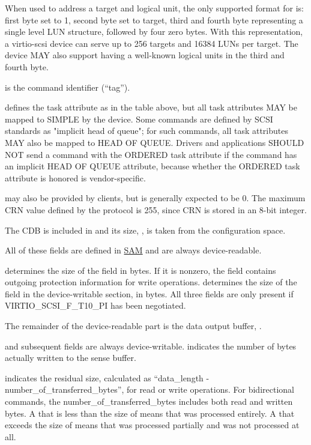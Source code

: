 When used to address a target and logical unit, the only supported format
for  is: first byte set to 1, second byte set to target,
third and fourth byte representing a single level LUN structure, followed
by four zero bytes. With this representation, a virtio-scsi device can
serve up to 256 targets and 16384 LUNs per target.  The device MAY also
support having a well-known logical units in the third and fourth byte.

 is the command identifier (``tag'').

 defines the task attribute as in the table above, but
all task attributes MAY be mapped to SIMPLE by the device.  Some commands
are defined by SCSI standards as "implicit head of queue"; for such
commands, all task attributes MAY also be mapped to HEAD OF QUEUE.
Drivers and applications SHOULD NOT send a command with the ORDERED
task attribute if the command has an implicit HEAD OF QUEUE attribute,
because whether the ORDERED task attribute is honored is vendor-specific.

 may also be provided by clients, but is generally expected
to be 0. The maximum CRN value defined by the protocol is 255, since
CRN is stored in an 8-bit integer.

The CDB is included in  and its size, ,
is taken from the configuration space.

All of these fields are defined in \hyperref[intro:SAM]{SAM} and are
always device-readable.

 determines the size of the  field
in bytes.  If it is nonzero, the  field contains outgoing
protection information for write operations.   determines
the size of the  field in the device-writable section, in bytes.
All three fields are only present if VIRTIO_SCSI_F_T10_PI has been negotiated.

The remainder of the device-readable part is the data output buffer,
.

 and subsequent fields are always device-writable. 
indicates the number of bytes actually written to the sense
buffer.

 indicates the residual size,
calculated as ``data_length - number_of_transferred_bytes'', for
read or write operations. For bidirectional commands, the
number_of_transferred_bytes includes both read and written bytes.
A  that is less than the size of  means that
 was processed entirely. A  that
exceeds the size of  means that  was
processed partially and  was not processed at
all.

